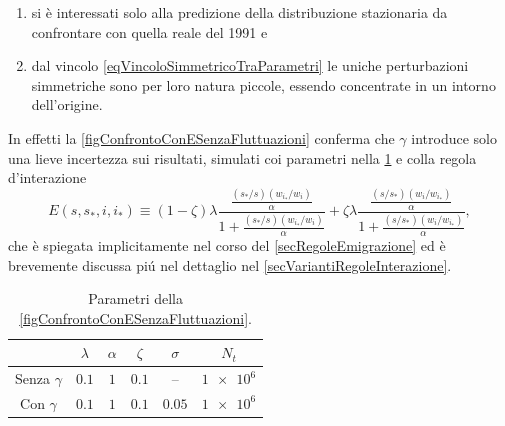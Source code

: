             \begin{enumerate}[
                label=\arabic*.,
            ]
                \item si è interessati solo alla predizione della distribuzione stazionaria da confrontare con quella reale del 1991 e
                \item dal vincolo \cref{eqVincoloSimmetricoTraParametri} le uniche perturbazioni simmetriche sono per loro natura piccole, essendo concentrate in un intorno dell'origine.
            \end{enumerate}

            In effetti la \cref{figConfrontoConESenzaFluttuazioni} conferma che \(\gamma\) introduce solo una lieve incertezza sui risultati, simulati coi parametri nella \cref{tabParametriConEsenzaGamma} e colla regola d'interazione
            \begin{equation}
                E(s,s_*,i,i_*)\equiv
                (1-\zeta)\lambda\frac{\frac{(s_*/s)(w_{i_*}/w_i)}\alpha}{1+\frac{(s_*/s)(w_{i_*}/w_i)}\alpha}
                +\zeta\lambda\frac{\frac{(s/s_*)(w_i/w_{i_*})}\alpha}{1+\frac{(s/s_*)(w_i/w_{i_*})}\alpha},
                \label{eqVarianteRegolaTagliaForzaFrazionata}
            \end{equation}
            che è spiegata implicitamente nel corso del \cref{secRegoleEmigrazione} ed è brevemente discussa piú nel dettaglio nel \cref{secVariantiRegoleInterazione}.

            \begin{table}[htb]
                \centering
                \begin{tabular}{cccccc}
                    \hline
                    &\(\lambda\)&\(\alpha\)&\(\zeta\)&\(\sigma\)&\(N_t\)\\
                    \hline
                    Senza \(\gamma\)&\(\num{0.1}\)&\(\num{1}\)&\(\num{0.1}\)&--&\(\num{1e6}\)\\
                    Con \(\gamma\)&\(\num{0.1}\)&\(\num{1}\)&\(\num{0.1}\)&\(\num{0.05}\)&\(\num{1e6}\)\\
                    \hline
                \end{tabular}
                \caption{Parametri della \cref{figConfrontoConESenzaFluttuazioni}.}
                \label{tabParametriConEsenzaGamma}
            \end{table}

